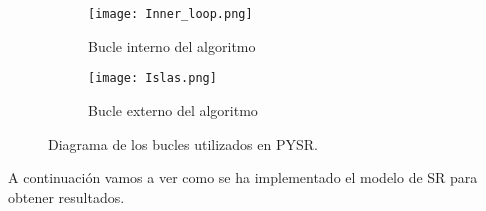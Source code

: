 \documentclass[11pt, a4paper]{article} %
\begin{document}
\begin{figure}[H]
    \centering
    \begin{subfigure}[b]{0.45\textwidth}
        \texttt{[image: Inner\_loop.png]}
        \caption{Bucle interno del algoritmo }
        \label{fig:sub11}
    \end{subfigure}
    \hfill
    \begin{subfigure}[b]{0.45\textwidth}
        \texttt{[image: Islas.png]}
        \caption{Bucle externo del algoritmo}
        \label{fig:sub22}
    \end{subfigure}
    \caption{Diagrama de los bucles utilizados en PYSR. \autocite{cranmerInterpretableMachineLearning2023}}
    \label{fig:imagenes_lado_a_ladoo}
\end{figure}

A continuación vamos a ver como se ha implementado el modelo de SR para obtener resultados.
\end{document}
